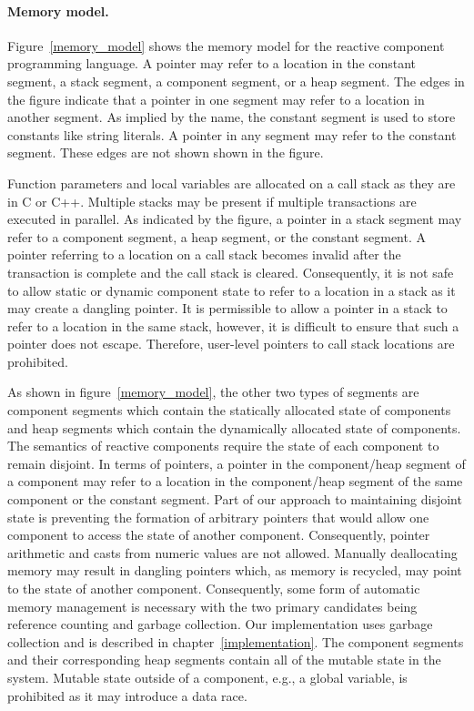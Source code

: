 \paragraph{Memory model.}
Figure~\ref{memory_model} shows the memory model for the reactive component programming language.
A pointer may refer to a location in the constant segment, a stack segment, a component segment, or a heap segment.
The edges in the figure indicate that a pointer in one segment may refer to a location in another segment.
As implied by the name, the constant segment is used to store constants like string literals.
A pointer in any segment may refer to the constant segment.
These edges are not shown shown in the figure.

Function parameters and local variables are allocated on a call stack as they are in C or C++.
Multiple stacks may be present if multiple transactions are executed in parallel.
As indicated by the figure, a pointer in a stack segment may refer to a component segment, a heap segment, or the constant segment.
A pointer referring to a location on a call stack becomes invalid after the transaction is complete and the call stack is cleared.
Consequently, it is not safe to allow static or dynamic component state to refer to a location in a stack as it may create a dangling pointer.
It is permissible to allow a pointer in a stack to refer to a location in the same stack, however, it is difficult to ensure that such a pointer does not escape.
Therefore, user-level pointers to call stack locations are prohibited.

As shown in figure~\ref{memory_model}, the other two types of segments are component segments which contain the statically allocated state of components and heap segments which contain the dynamically allocated state of components.
The semantics of reactive components require the state of each component to remain disjoint.
In terms of pointers, a pointer in the component/heap segment of a component may refer to a location in the component/heap segment of the same component or the constant segment.
Part of our approach to maintaining disjoint state is preventing the formation of arbitrary pointers that would allow one component to access the state of another component.
Consequently, pointer arithmetic and casts from numeric values are not allowed.
Manually deallocating memory may result in dangling pointers which, as memory is recycled, may point to the state of another component.
Consequently, some form of automatic memory management is necessary with the two primary candidates being reference counting and garbage collection.
Our implementation uses garbage collection and is described in chapter~\ref{implementation}.
The component segments and their corresponding heap segments contain all of the mutable state in the system.
Mutable state outside of a component, e.g., a global variable, is prohibited as it may introduce a data race.

